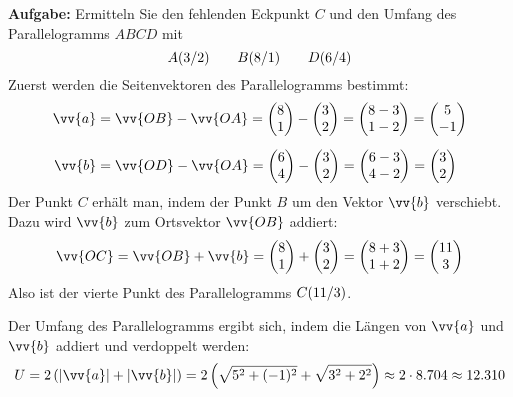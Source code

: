 \textbf{Aufgabe:} Ermitteln Sie den fehlenden Eckpunkt $C$ und den Umfang des Parallelogramms $ABCD$ mit
\[
  \pxy[A]{3,2} \qquad \pxy[B]{8,1} \qquad \pxy[D]{6,4}
\]
Zuerst werden die Seitenvektoren des Parallelogramms bestimmt:
\begin{align*}
  \vv{a} &= \vv{OB}-\vv{OA} = \vxy{8,1}-\vxy{3,2} = \vxy{8-3,1-2} = \vxy{5,-1} \\[2mm]
  \vv{b} &= \vv{OD}-\vv{OA} = \vxy{6,4}-\vxy{3,2} = \vxy{6-3,4-2} = \vxy{3,2}
\end{align*}
Der Punkt $C$ erhält man, indem der Punkt $B$ um den Vektor $\vv{b}$ verschiebt. Dazu wird $\vv{b}$ zum Ortsvektor $\vv{OB}$ addiert:
\[
  \vv{OC} = \vv{OB} + \vv{b} = \vxy{8,1} + \vxy{3,2} = \vxy{8+3,1+2} = \vxy{11,3}
\]
Also ist der vierte Punkt des Parallelogramms $\pxy[C]{11,3}$.

\begin{center}
\end{center}

Der Umfang des Parallelogramms ergibt sich, indem die Längen von $\vv{a}$ und $\vv{b}$ addiert und verdoppelt werden:
\[
  U = 2\left(|\vv{a}| + |\vv{b}|\right) = 2\left(\sqrt{5^{2}+(-1)^2}+\sqrt{3^{2}+2^{2}}\right) \approx 2\cdot 8.704 \approx 12.310
\]

